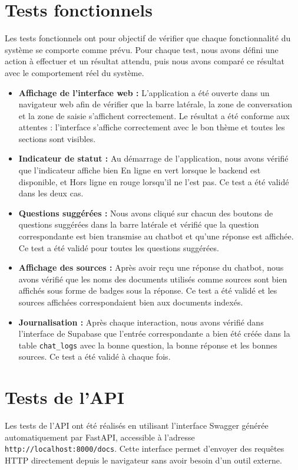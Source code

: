 \documentclass[12pt, a4paper, twoside]{report}
\begin{document}
\section{Tests fonctionnels}
Les tests fonctionnels ont pour objectif de vérifier que chaque fonctionnalité du système se comporte comme prévu. Pour chaque test, nous avons défini une action à effectuer et un résultat attendu, puis nous avons comparé ce résultat avec le comportement réel du système.

\begin{itemize}[label=\bullet]
    \item \textbf{Affichage de l'interface web :} L'application a été ouverte dans un navigateur web afin de vérifier que la barre latérale, la zone de conversation et la zone de saisie s'affichent correctement. Le résultat a été conforme aux attentes : l'interface s'affiche correctement avec le bon thème et toutes les sections sont visibles.
    \item \textbf{Indicateur de statut :} Au démarrage de l'application, nous avons vérifié que l'indicateur affiche bien \og En ligne \fg en vert lorsque le backend est disponible, et \og Hors ligne \fg en rouge lorsqu'il ne l'est pas. Ce test a été validé dans les deux cas.
    \item \textbf{Questions suggérées :} Nous avons cliqué sur chacun des boutons de questions suggérées dans la barre latérale et vérifié que la question correspondante est bien transmise au chatbot et qu'une réponse est affichée. Ce test a été validé pour toutes les questions suggérées.
    \item \textbf{Affichage des sources :} Après avoir reçu une réponse du chatbot, nous avons vérifié que les noms des documents utilisés comme sources sont bien affichés sous forme de badges sous la réponse. Ce test a été validé et les sources affichées correspondaient bien aux documents indexés.
    \item \textbf{Journalisation :} Après chaque interaction, nous avons vérifié dans l'interface de Supabase que l'entrée correspondante a bien été créée dans la table \texttt{chat\_logs} avec la bonne question, la bonne réponse et les bonnes sources. Ce test a été validé à chaque fois.
\end{itemize}

\section{Tests de l'API}
Les tests de l'API ont été réalisés en utilisant l'interface Swagger générée automatiquement par FastAPI, accessible à l'adresse \texttt{http://localhost:8000/docs}. Cette interface permet d'envoyer des requêtes HTTP directement depuis le navigateur sans avoir besoin d'un outil externe.
\end{document}
